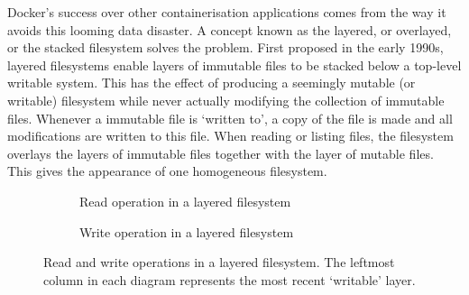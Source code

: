 Docker's success over other containerisation applications comes from the way it avoids this looming data disaster.
A concept known as the layered, or overlayed, or the stacked filesystem solves the problem.
First proposed in the early 1990s, layered filesystems enable layers of immutable files to be stacked below a top-level writable system.
This has the effect of producing a seemingly mutable (or writable) filesystem while never actually modifying the collection of immutable files.
Whenever a immutable file is `written to', a copy of the file is made and all modifications are written to this file.
When reading or listing files, the filesystem overlays the layers of immutable files together with the layer of mutable files.
This gives the appearance of one homogeneous filesystem.

\begin{figure}[h]
\centering
\begin{subfigure}[b]{0.5\textwidth}
\caption{Read operation in a layered filesystem}
\end{subfigure}
\begin{subfigure}[b]{0.45\textwidth}
\caption{Write operation in a layered filesystem}
\end{subfigure}

\caption{Read and write operations in a layered filesystem. The leftmost column in each diagram represents the most recent `writable' layer.}
\end{figure}

